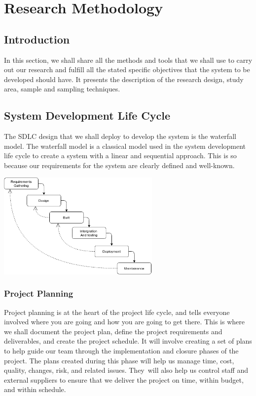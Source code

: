 \documentclass{article}
\begin{document}
\newpage
\section{Research Methodology}
\subsection{Introduction }
In this section, we shall share all the methods and tools that we shall use to carry out our research and fulfill all the stated specific objectives that the system to be developed should have.  It presents the description of the research design, study area, sample and sampling techniques. 

\subsection{System Development Life Cycle}
The SDLC design that we shall deploy to develop the system is the waterfall model. The waterfall model is a classical model used in the system development life cycle to create a system with a linear and sequential approach. This is so because our requirements for the system are clearly defined and well-known.


\begin{center}
\vspace{30px}
\includegraphics[width=300px]{Proposal_waterfall-SDLC.png}
\label{SDLC_waterfall_diagram}
\vspace{30px}
\end{center}

\subsubsection{Project Planning}
Project planning is at the heart of the project life cycle, and tells everyone involved where you are going and how you are going to get there. This is where we shall document the project plan, define the project requirements and deliverables, and create the project schedule. It will involve creating a set of plans to help guide our team through the implementation and closure phases of the project. The plans created during this phase will help us manage time, cost, quality, changes, risk, and related issues. They will also help us control staff and external suppliers to ensure that we deliver the project on time, within budget, and within schedule.
\end{document}
